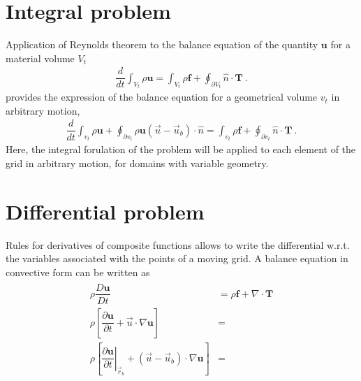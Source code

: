 \documentclass[letterpaper,10pt,english]{jupyterBook}
\begin{document}
\section{Integral problem}
\label{\detokenize{ch/pde/ale:integral-problem}}\label{\detokenize{ch/pde/ale:pde-ale-description-integral}}
\sphinxAtStartPar
Application of Reynolds theorem to the balance equation of the quantity \(\mathbf{u}\) for a material volume \(V_t\)
\begin{equation*}
\begin{split}\dfrac{d}{dt} \int_{V_t} \rho \mathbf{u} = \int_{V_t} \rho \mathbf{f} + \oint_{\partial V_t} \hat{n} \cdot \mathbf{T} \ .\end{split}
\end{equation*}
\sphinxAtStartPar
provides the expression of the balance equation for a geometrical volume \(v_t\) in arbitrary motion,
\begin{equation*}
\begin{split}\dfrac{d}{dt} \int_{v_t} \rho \mathbf{u} + \oint_{\partial v_t} \rho \mathbf{u} \left( \vec{u} - \vec{u}_b \right) \cdot \hat{n} = \int_{v_t} \rho \mathbf{f} + \oint_{\partial v_t} \hat{n} \cdot \mathbf{T} \ .\end{split}
\end{equation*}
\sphinxAtStartPar
Here, the integral forulation of the problem will be applied to each element of the grid in arbitrary motion, for domains with variable geometry.


\section{Differential problem}
\label{\detokenize{ch/pde/ale:differential-problem}}\label{\detokenize{ch/pde/ale:pde-ale-description-differential}}
\sphinxAtStartPar
Rules for derivatives of composite functions allows to write the differential w.r.t. the variables associated with the points of a moving grid. A balance equation in convective form can be written as
\begin{equation*}
\begin{split}\begin{aligned}
  \rho \dfrac{D \mathbf{u}}{D t} & = \rho \mathbf{f} + \nabla \cdot \mathbf{T} \\
  \rho \left[ \dfrac{\partial \mathbf{u}}{\partial t} + \vec{u} \cdot \nabla \mathbf{u} \right] & = \\
  \rho \left[ \left.\dfrac{\partial \mathbf{u}}{\partial t}\right|_{\vec{r}_b} + \left( \vec{u} - \vec{u}_b \right) \cdot \nabla \mathbf{u} \right] & = \\
\end{aligned}\end{split}
\end{equation*}
\end{document}
